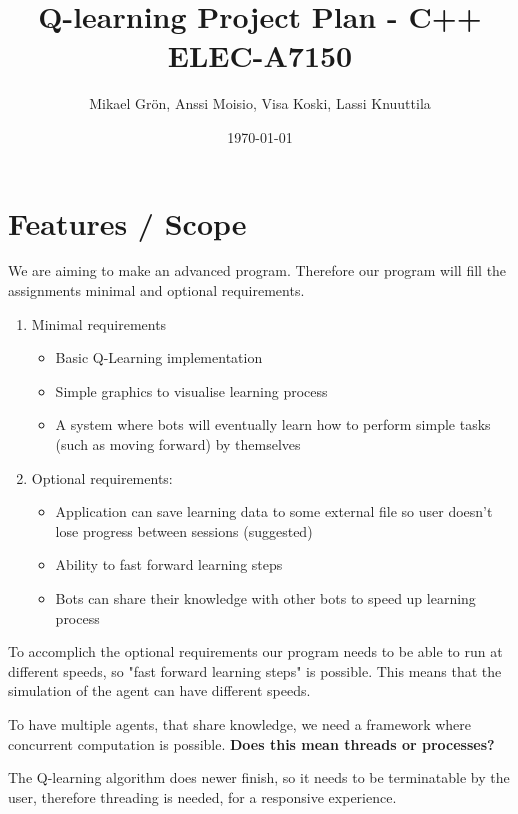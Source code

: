 \documentclass{article}
\author{Mikael Grön, Anssi Moisio, Visa Koski, Lassi Knuuttila}
\title{Q-learning Project Plan - C++ ELEC-A7150}
\date{\today}
\begin{document}
\maketitle



\section{Features / Scope}
We are aiming to make an advanced program. Therefore our program will fill
the assignments minimal and optional requirements.

\begin{enumerate}
\item Minimal requirements
    \begin{itemize}
    \item Basic Q-Learning implementation
    \item Simple graphics to visualise learning process
    \item A system where bots will eventually learn how to perform simple
    tasks (such as moving forward) by themselves
    \end{itemize}
\item Optional requirements:
    \begin{itemize}
    \item Application can save learning data to some external file so user
    doesn't lose progress between sessions (suggested)
    \item Ability to fast forward learning steps
    \item Bots can share their knowledge with other bots to speed up learning
    process
    \end{itemize}
\end{enumerate}

To accomplich the optional requirements our program needs to be able to run
at different speeds, so "fast forward learning steps" is possible. This
means that the simulation of the agent can have different speeds.

To have multiple agents, that share knowledge, we need a framework where
concurrent computation is possible. \textbf{Does this mean threads or
processes?}

The Q-learning algorithm does newer finish, so it needs to be terminatable
by the user, therefore threading is needed, for a responsive experience.
\end{document}
